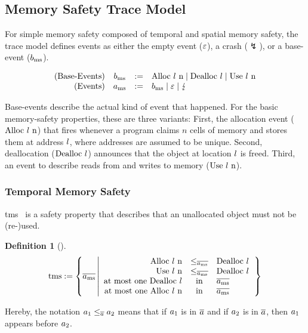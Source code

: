 \documentclass[dvipsnames,conference]{IEEEtran}
\theoremstyle{definition}
\newtheorem{definition}{Definition}[section]
\begin{document}
\subsection{Memory Safety Trace Model}\label{subsec:basic:memsafety:tracemodel}

For simple memory safety composed of temporal and spatial memory safety, the trace model defines events as either the empty event ($\emptyevent$), a crash ($\lightning$), or a base-event ($\preevent[_{\mssafe}]$).

\vspace{-1.0em}
\[
  \begin{array}{rcll}
    \text{(Base-Events)}&\preevent[_{\mssafe}] &:=& \ev{Alloc \loc\ n} \mid \ev{Dealloc \loc} \mid \ev{Use \loc\ n} \\
    \text{(Events)}&\event[_{\mssafe}] &:=& \preevent[_{\mssafe}] \mid \emptyevent \mid \lightning \\ 
  \end{array}
\]

Base-events describe the actual kind of event that happened.
For the basic memory-safety properties, these are three variants:
First, the allocation event ($\ev{Alloc\ \loc\ n}$) that fires whenever a program claims $n$ cells of memory and stores them at address $\loc$, where addresses are assumed to be unique.
Second, deallocation ($\ev{Dealloc\ \loc}$) announces that the object at location $\loc$ is freed.
Third, an event to describe reads from and writes to memory ($\ev{Use\ \loc\ n}$).

\subsubsection{Temporal Memory Safety}

\gls*{tms}~\cite{nagarakatte2010cets} is a safety property that describes that an unallocated object must not be (re-)used.

\begin{definition}[]\label{def:trace:tmsdef}
  $$
  \tmssafe:=\left\{\trace[_{\mssafe}] \left| \begin{array}{rcl}
    \ev{Alloc\ \loc\ n}&\le_{\trace[_{\mssafe}]}&\ev{Dealloc\ \loc} \\
    \ev{Use\ \loc\ n}&\le_{\trace[_{\mssafe}]}&\ev{Dealloc\ \loc} \\
    \text{at most one }\ev{Dealloc\ \loc}&\text{in}&\trace[_{\mssafe}] \\
    \text{at most one }\ev{Alloc\ \loc\ n}&\text{in}&\trace[_{\mssafe}] \\
  \end{array}\right.\right\}
  $$
\end{definition}
Hereby, the notation $\event[_{1}]\le_{\trace}\event[_{2}]$ means that if $\event[_{1}]$ is in $\trace$ and if $\event[_{2}]$ is in $\trace$, then $\event[_{1}]$ appears before $\event[_{2}]$.
\end{document}
